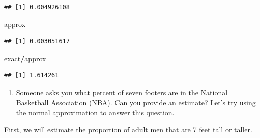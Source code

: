 \documentclass[
]{article}
\newenvironment{Shaded}{\begin{snugshade}}{\end{snugshade}}
\newcommand{\DecValTok}[1]{\textcolor[rgb]{0.00,0.00,0.81}{#1}}
\newcommand{\KeywordTok}[1]{\textcolor[rgb]{0.13,0.29,0.53}{\textbf{#1}}}
\newcommand{\NormalTok}[1]{#1}
\newcommand{\OperatorTok}[1]{\textcolor[rgb]{0.81,0.36,0.00}{\textbf{#1}}}
\newcommand{\StringTok}[1]{\textcolor[rgb]{0.31,0.60,0.02}{#1}}
\providecommand{\tightlist}{%
  \setlength{\itemsep}{0pt}\setlength{\parskip}{0pt}}
\begin{document}
\begin{Shaded}
\end{Shaded}

\begin{verbatim}
## [1] 0.004926108
\end{verbatim}

\begin{Shaded}
\begin{Highlighting}[]
\NormalTok{approx}
\end{Highlighting}
\end{Shaded}

\begin{verbatim}
## [1] 0.003051617
\end{verbatim}

\begin{Shaded}
\begin{Highlighting}[]
\NormalTok{exact}\OperatorTok{/}\NormalTok{approx}
\end{Highlighting}
\end{Shaded}

\begin{verbatim}
## [1] 1.614261
\end{verbatim}

\begin{enumerate}
\def\labelenumi{\arabic{enumi}.}
\setcounter{enumi}{3}
\tightlist
\item
  Someone asks you what percent of seven footers are in the National
  Basketball Association (NBA). Can you provide an estimate? Let's try
  using the normal approximation to answer this question.
\end{enumerate}

First, we will estimate the proportion of adult men that are 7 feet tall
or taller.
\end{document}
